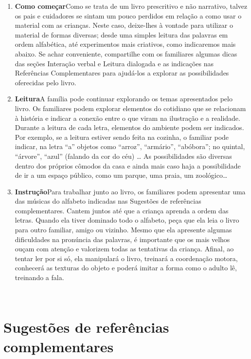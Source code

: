 \documentclass[11pt]{extarticle}
\begin{document}
\begin{enumerate}
\item \textbf{Como começar}\quad Como se trata de um livro
prescritivo e não narrativo, talvez os pais e cuidadores
se sintam um pouco perdidos em relação a como usar o material
com as crianças. Neste caso, deixe-lhes à vontade para 
utilizar o material de formas diversas; desde uma simples leitura
das palavras em ordem alfabética, até experimentos mais criativos,
como indicaremos mais abaixo. Se achar conveniente, compartilhe com 
os familiares algumas dicas das seções Interação verbal 
e Leitura dialogada e as indicações nas Referências Complementares 
para ajudá-los a explorar as possibilidades oferecidas pelo livro. 

\item \textbf{Leitura}\quad A família pode continuar 
explorando os temas apresentados pelo livro. Os familiares podem explorar 
elementos do cotidiano que se relacionam à história e indicar a conexão 
entre o que viram na ilustração e a realidade. Durante a leitura 
de cada letra, elementos do ambiente podem ser indicados. Por exemplo,
se a leitura estiver sendo feita na cozinha, o familiar pode indicar,
na letra ``a'' objetos como ``arroz'', ``armário'', ``abóbora''; no
quintal, ``árvore'', ``azul'' (falando da cor do céu) \dots{} As possibilidades
são diversas dentro dos próprios cômodos da casa e ainda mais
caso haja a possibilidade de ir a um espaço público, como um parque,
uma praia, um zoológico\dots{}

\item \textbf{Instrução}\quad Para trabalhar junto ao livro,
os familiares podem apresentar uma das músicas do alfabeto
indicadas nas Sugestões de referências complementares.
Cantem juntos até que a criança aprenda a ordem das letras.
Quando ela tiver dominado todo o alfabeto, peça que ela leia
o livro para outro familiar, amigo ou vizinho. Mesmo que ela
apresente algumas dificuldades na pronúncia das palavras, é importante 
que os mais velhos ouçam com atenção e valorizem todas as tentativas 
da criança. Afinal, ao tentar ler por si só, ela manipulará o livro, 
treinará a coordenação motora, conhecerá as texturas do objeto e
poderá imitar a forma como o adulto lê, treinando a fala. 
\end{enumerate}

 
\section{Sugestões de referências complementares}
\end{document}
